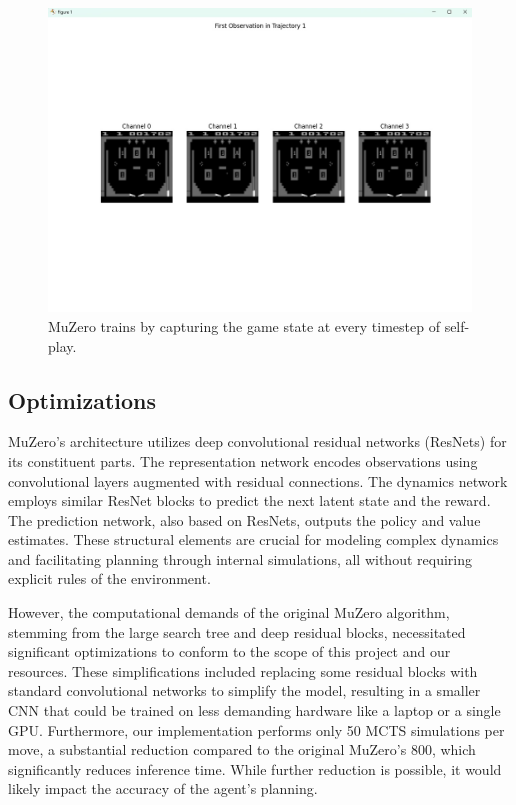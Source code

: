 \documentclass{article}
\begin{document}
\begin{figure}[H]
    \centering
    \includegraphics[width=1.0\textwidth]{pinball_training.jpeg}
    \caption{MuZero trains by capturing the game state at every timestep of self-play.}
    \label{fig:pinball_training}
\end{figure}

\subsection{Optimizations}
MuZero's architecture utilizes deep convolutional residual networks (ResNets) for its constituent parts. The representation network encodes observations using convolutional layers augmented with residual connections. The dynamics network employs similar ResNet blocks to predict the next latent state and the reward. The prediction network, also based on ResNets, outputs the policy and value estimates. These structural elements are crucial for modeling complex dynamics and facilitating planning through internal simulations, all without requiring explicit rules of the environment.

However, the computational demands of the original MuZero algorithm, stemming from the large search tree and deep residual blocks, necessitated significant optimizations to conform to the scope of this project and our resources. These simplifications included replacing some residual blocks with standard convolutional networks to simplify the model, resulting in a smaller CNN that could be trained on less demanding hardware like a laptop or a single GPU. Furthermore, our implementation performs only 50 MCTS simulations per move, a substantial reduction compared to the original MuZero's 800, which significantly reduces inference time. While further reduction is possible, it would likely impact the accuracy of the agent's planning.
\end{document}
